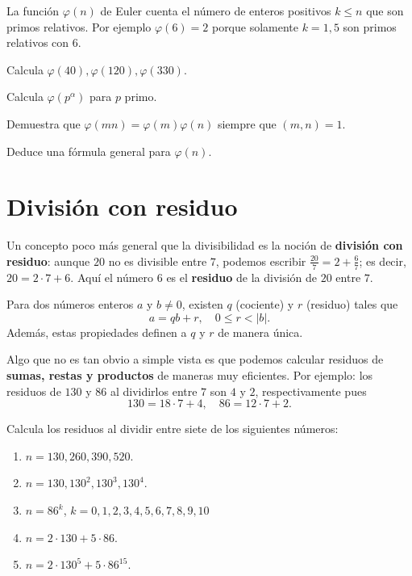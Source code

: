 La función $\varphi(n)$ de Euler cuenta el número de enteros positivos $k\leq n$ que son primos relativos. Por ejemplo $\varphi(6)=2$ porque solamente $k=1,5$ son primos relativos con $6$.

\begin{ejercicio}
Calcula $\varphi (40), \varphi (120), \varphi (330)$.
\end{ejercicio}

\begin{ejercicio}
Calcula $\varphi (p^\alpha)$ para $p$ primo.
\end{ejercicio}

\begin{ejercicio}
Demuestra que $\varphi (mn)=\varphi (m)\varphi (n)$ siempre que $(m,n)=1$.

Deduce una fórmula general para $\varphi (n)$.
\end{ejercicio}

\section{División con residuo}

Un concepto poco más general que la divisibilidad es la noción de \textbf{división con residuo}: aunque $20$
no es divisible entre $7$, podemos escribir $\frac{20}{7} = 2+\frac{6}{7}$; es decir, $20 = 2\cdot 7 + 6$. Aquí el número $6$ es el \textbf{residuo}
de la división de $20$ entre $7$.

\begin{proposicion}
  Para dos números enteros $a$ y $b \ne 0$, existen $q$ (cociente) y $r$
  (residuo) tales que
  \[ a = qb + r,
    \quad
    0 \le r < |b|. \]
  Además, estas propiedades definen a $q$ y $r$ de manera única.
\end{proposicion}

Algo que no es tan obvio a simple vista es que podemos calcular residuos de {\bf sumas, restas y productos} de maneras muy eficientes.  Por ejemplo: los residuos de $130$ y $86$ al dividirlos entre $7$ son $4$ y $2$, respectivamente pues \[130=18\cdot 7+4,\quad 86=12\cdot 7+2.\] 

\begin{ejercicio}
Calcula los residuos al dividir entre siete de los siguientes números: 
 \begin{enumerate}
     \item $n=130, 260, 390, 520$.
     \item $n=130, 130^2, 130^3, 130^4$.
     \item $n=86^k$, $k=0,1,2,3,4,5,6,7,8,9,10$
     \item $n=2\cdot130+5\cdot86$.
     \item $n=2\cdot130^5+5\cdot86^{15}$.
 \end{enumerate}
\end{ejercicio}

